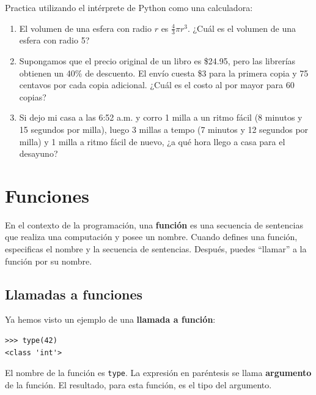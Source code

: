 \documentclass[10pt]{book}
\begin{document}
\begin{exercise}

Practica utilizando el intérprete de Python como una calculadora:

\begin{enumerate}

\item El volumen de una esfera con radio $r$ es $\frac{4}{3} \pi r^3$.
  ¿Cuál es el volumen de una esfera con radio 5?

\item Supongamos que el precio original de un libro es \$24.95, pero las librerías obtienen
  un 40\% de descuento.  El envío cuesta \$3 para la primera copia y 75 centavos
  por cada copia adicional.  ¿Cuál es el costo al por mayor para
  60 copias?

\item Si dejo mi casa a las 6:52 a.m. y corro 1 milla a un ritmo fácil
  (8 minutos y 15 segundos por milla), luego 3 millas a tempo (7 minutos y 12 segundos por milla) y 1 milla
  a ritmo fácil de nuevo, ¿a qué hora llego a casa para el desayuno?

\end{enumerate}
\end{exercise}


\chapter{Funciones}
\label{funcchap}

En el contexto de la programación, una {\bf función} es una secuencia de sentencias
que realiza una computación y posee un nombre.  Cuando defines una función,
especificas el nombre y la secuencia de sentencias.  Después, puedes
``llamar'' a la función por su nombre.

\section{Llamadas a funciones}
\label{functionchap}

Ya hemos visto un ejemplo de una {\bf llamada a función}:

\begin{verbatim}
>>> type(42)
<class 'int'>
\end{verbatim}
%
El nombre de la función es {\tt type}.  La expresión en paréntesis
se llama {\bf argumento} de la función.  El resultado, para esta
función, es el tipo del argumento.
\end{document}
